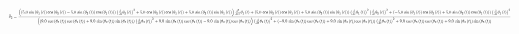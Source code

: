  

\begin{equation}\label{ddtheta3}
\scalemath{0.3}{\ddot{\theta}{_3} =	
{\frac { \left(  \left(  5.0\,\sin \left( \theta_{{1}} \left( t
 \right)  \right) \cos \left( \theta_{{2}} \left( t \right)  \right) -
 5.0\,\sin \left( \theta_{{2}} \left( t \right)  \right) \cos \left( 
\theta_{{1}} \left( t \right)  \right)  \right)  \left( {\frac {\rm d}
{{\rm d}t}}\theta_{{2}} \left( t \right)  \right) ^{2}+ 5.0\,\cos
 \left( \theta_{{2}} \left( t \right)  \right) \cos \left( \theta_{{1}
} \left( t \right)  \right) + 5.0\,\sin \left( \theta_{{2}} \left( t
 \right)  \right) \sin \left( \theta_{{1}} \left( t \right)  \right) 
 \right) {\frac {{\rm d}^{2}}{{\rm d}{t}^{2}}}\theta_{{1}} \left( t
 \right) + \left(  5.0\,\cos \left( \theta_{{2}} \left( t \right) 
 \right) \cos \left( \theta_{{1}} \left( t \right)  \right) + 5.0\,
\sin \left( \theta_{{2}} \left( t \right)  \right) \sin \left( \theta_
{{1}} \left( t \right)  \right)  \right)  \left( {\frac {\rm d}{
{\rm d}t}}\theta_{{1}} \left( t \right)  \right) ^{2} \left( {\frac 
{\rm d}{{\rm d}t}}\theta_{{2}} \left( t \right)  \right) ^{2}+ \left( 
- 5.0\,\sin \left( \theta_{{1}} \left( t \right)  \right) \cos \left( 
\theta_{{2}} \left( t \right)  \right) + 5.0\,\sin \left( \theta_{{2}}
 \left( t \right)  \right) \cos \left( \theta_{{1}} \left( t \right) 
 \right)  \right)  \left( {\frac {\rm d}{{\rm d}t}}\theta_{{1}}
 \left( t \right)  \right) ^{2}}{ \left(  \left(  9.0\,\cos \left( 
\theta_{{3}} \left( t \right)  \right) \cos \left( \theta_{{2}}
 \left( t \right)  \right) + 9.0\,\sin \left( \theta_{{2}} \left( t
 \right)  \right) \sin \left( \theta_{{3}} \left( t \right)  \right) 
 \right)  \left( {\frac {\rm d}{{\rm d}t}}\theta_{{3}} \left( t
 \right)  \right) ^{2}+ 9.0\,\sin \left( \theta_{{3}} \left( t
 \right)  \right) \cos \left( \theta_{{2}} \left( t \right)  \right) -
 9.0\,\sin \left( \theta_{{2}} \left( t \right)  \right) \cos \left( 
\theta_{{3}} \left( t \right)  \right)  \right)  \left( {\frac {\rm d}
{{\rm d}t}}\theta_{{2}} \left( t \right)  \right) ^{2}+ \left( - 9.0\,
\sin \left( \theta_{{3}} \left( t \right)  \right) \cos \left( \theta_
{{2}} \left( t \right)  \right) + 9.0\,\sin \left( \theta_{{2}}
 \left( t \right)  \right) \cos \left( \theta_{{3}} \left( t \right) 
 \right)  \right)  \left( {\frac {\rm d}{{\rm d}t}}\theta_{{3}}
 \left( t \right)  \right) ^{2}+ 9.0\,\cos \left( \theta_{{3}} \left( 
t \right)  \right) \cos \left( \theta_{{2}} \left( t \right)  \right) 
+ 9.0\,\sin \left( \theta_{{2}} \left( t \right)  \right) \sin \left( 
\theta_{{3}} \left( t \right)  \right) }}
}
\end{equation}

